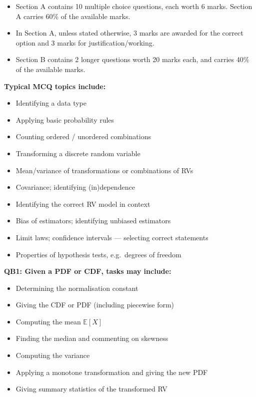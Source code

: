 \documentclass[11pt]{article}
\begin{document}
\begin{itemize}
	\item Section A contains 10 multiple choice questions, each worth 6 marks. Section A carries 60\% of the available marks. 
	\item In Section A, unless stated otherwise, 3 marks are awarded for the correct option and 3 marks for justification/working.
	\item Section B contains 2 longer questions worth 20 marks each, and carries 40\% of the available marks.
\end{itemize}

\vspace{0.5em}
\textbf{Typical MCQ topics include:}
\begin{itemize}
	\item Identifying a data type
	\item Applying basic probability rules
	\item Counting ordered / unordered combinations
	\item Transforming a discrete random variable
	\item Mean/variance of transformations or combinations of RVs
	\item Covariance; identifying (in)dependence
	\item Identifying the correct RV model in context
	\item Bias of estimators; identifying unbiased estimators
	\item Limit laws; confidence intervals — selecting correct statements
	\item Properties of hypothesis tests, e.g.\ degrees of freedom
\end{itemize}

\vspace{0.5em}
\textbf{QB1: Given a PDF or CDF, tasks may include:}
\begin{itemize}
	\item Determining the normalisation constant
	\item Giving the CDF or PDF (including piecewise form)
	\item Computing the mean $\mathbb E[X]$
	\item Finding the median and commenting on skewness
	\item Computing the variance
	\item Applying a monotone transformation and giving the new PDF
	\item Giving summary statistics of the transformed RV
\end{itemize}
\end{document}
